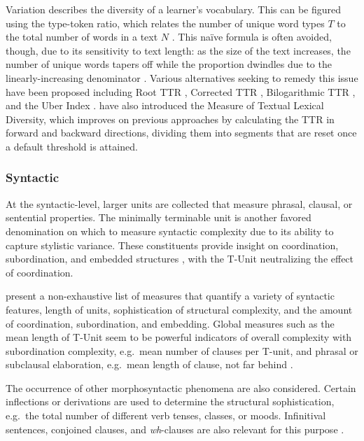 Variation describes the diversity of a learner's vocabulary. This can be figured using the type-token ratio, which relates the number of unique word types $T$ to the total number of words in a text $N$ \citep{templin1957}. This naïve formula is often avoided, though, due to its sensitivity to text length: as the size of the text increases, the number of unique words tapers off while the proportion dwindles due to the linearly-increasing denominator \citep{mccarthy2007}. Various alternatives seeking to remedy this issue have been proposed including Root TTR \cite[RTTR;][]{guiraud1960}, Corrected TTR \cite[CTTR;][]{carroll1964}, Bilogarithmic TTR \cite[LogTTR;][]{herdan1964}, and the Uber Index \citep{dugast1979}. \cite{mccarthy2010} have also introduced the Measure of Textual Lexical Diversity, which improves on previous approaches by calculating the TTR in forward and backward directions, dividing them into segments that are reset once a default threshold is attained.

\subsubsection{Syntactic}

At the syntactic-level, larger units are collected that measure phrasal, clausal, or sentential properties. The minimally terminable unit \citep[T-Unit;][]{hunt1965} is another favored denomination on which to measure syntactic complexity due to its ability to capture stylistic variance. These constituents provide insight on coordination, subordination, and embedded structures \citep{ortega2003}, with the T-Unit neutralizing the effect of coordination.

 present a non-exhaustive list of measures that quantify a variety of syntactic features, length of units, sophistication of structural complexity, and the amount of coordination, subordination, and embedding. Global measures such as the mean length of T-Unit seem to be powerful indicators of overall complexity \citep{wq1998, ortega2003, norris2009} with subordination complexity, e.g.\ mean number of clauses per T-unit, and phrasal or subclausal elaboration, e.g.\ mean length of clause, not far behind \citep{norris2009}.

The occurrence of other morphosyntactic phenomena are also considered. Certain inflections or derivations are used to determine the structural sophistication, e.g.\ the total number of different verb tenses, classes, or moods. Infinitival sentences, conjoined clauses, and \textit{wh}-clauses are also relevant for this purpose \citep{norris2009, pallotti2009}.

